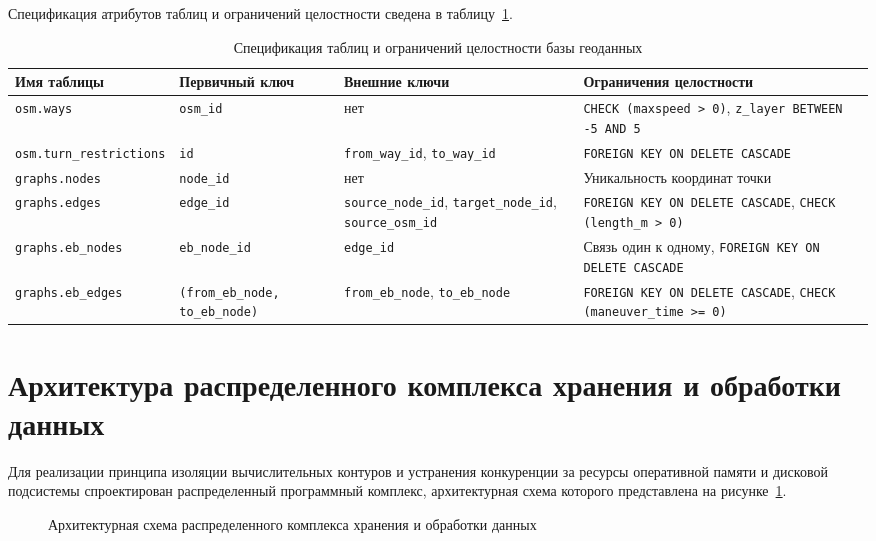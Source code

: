 Спецификация атрибутов таблиц и ограничений целостности сведена в таблицу~\ref{tab:entities_spec}.

\begin{table}[htbp]
\small
\centering
\caption{Спецификация таблиц и ограничений целостности базы геоданных}
\label{tab:entities_spec}
\begin{tabularx}{\linewidth}{|l|l|l|X|}
\hline
\textbf{Имя таблицы} & \textbf{Первичный ключ} & \textbf{Внешние ключи} & \textbf{Ограничения целостности} \\ \hline
\texttt{osm.ways} & \texttt{osm\_id} & нет & \texttt{CHECK (maxspeed > 0)}, \texttt{z\_layer BETWEEN -5 AND 5} \\ \hline
\texttt{osm.turn\_restrictions} & \texttt{id} & \texttt{from\_way\_id}, \texttt{to\_way\_id} & \texttt{FOREIGN KEY ON DELETE CASCADE} \\ \hline
\texttt{graphs.nodes} & \texttt{node\_id} & нет & Уникальность координат точки \\ \hline
\texttt{graphs.edges} & \texttt{edge\_id} & \texttt{source\_node\_id}, \texttt{target\_node\_id}, \texttt{source\_osm\_id} & \texttt{FOREIGN KEY ON DELETE CASCADE}, \texttt{CHECK (length\_m > 0)} \\ \hline
\texttt{graphs.eb\_nodes} & \texttt{eb\_node\_id} & \texttt{edge\_id} & Связь один к одному, \texttt{FOREIGN KEY ON DELETE CASCADE} \\ \hline
\texttt{graphs.eb\_edges} & \texttt{(from\_eb\_node, to\_eb\_node)} & \texttt{from\_eb\_node}, \texttt{to\_eb\_node} & \texttt{FOREIGN KEY ON DELETE CASCADE}, \texttt{CHECK (maneuver\_time >= 0)} \\ \hline
\end{tabularx}
\end{table}

\section{Архитектура распределенного комплекса хранения и обработки данных}
\label{sec:system_architecture}

Для реализации принципа изоляции вычислительных контуров и устранения конкуренции за ресурсы оперативной памяти и дисковой подсистемы спроектирован распределенный программный комплекс, архитектурная схема которого представлена на рисунке~\ref{fig:system_arch}.

\begin{figure}[htbp]
    \centering
    
    \caption{Архитектурная схема распределенного комплекса хранения и обработки данных}
    \label{fig:system_arch}
\end{figure}

